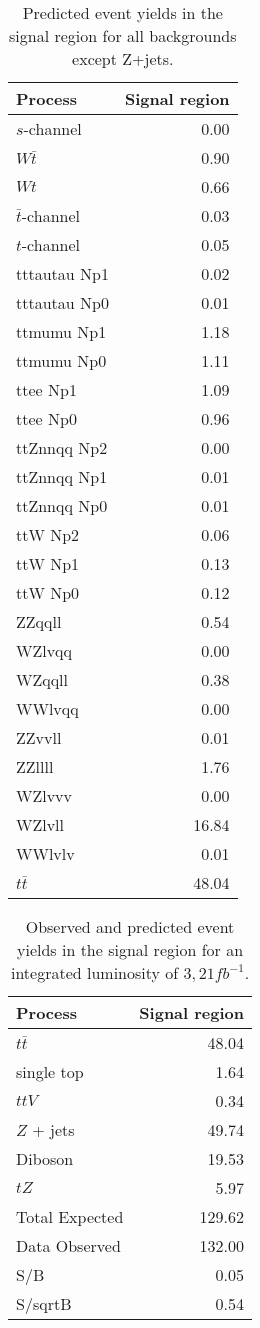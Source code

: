 \documentclass[10pt,twoside,a4paper]{article}
\begin{document}
 
\begin{table} [ht!]
\setlength{\tabcolsep}{2pt}
\footnotesize
\centering
\begin{tabular}{l | r}
\hline
\hline
Process & Signal region \\ 
\hline
$s$-channel & 0.00 \\ 
$W\bar{t}$ & 0.90 \\ 
$Wt$ & 0.66 \\ 
$\bar{t}$-channel & 0.03 \\ 
$t$-channel & 0.05 \\ 
tttautau Np1 & 0.02 \\ 
tttautau Np0 & 0.01 \\ 
ttmumu Np1 & 1.18 \\ 
ttmumu Np0 & 1.11 \\ 
ttee Np1 & 1.09 \\ 
ttee Np0 & 0.96 \\ 
ttZnnqq Np2 & 0.00 \\ 
ttZnnqq Np1 & 0.01 \\ 
ttZnnqq Np0 & 0.01 \\ 
ttW Np2 & 0.06 \\ 
ttW Np1 & 0.13 \\ 
ttW Np0 & 0.12 \\ 
ZZqqll & 0.54 \\ 
WZlvqq & 0.00 \\ 
WZqqll & 0.38 \\ 
WWlvqq & 0.00 \\ 
ZZvvll & 0.01 \\ 
ZZllll & 1.76 \\ 
WZlvvv & 0.00 \\ 
WZlvll & 16.84 \\ 
WWlvlv & 0.01 \\ 
$t\bar{t}$ & 48.04 \\ 
\hline
\hline
\end{tabular}
\caption{Predicted event yields in the signal region for all backgrounds except Z+jets.}
\label{tab:eventyield_BG}
\end{table}

 
\begin{table} [ht!]
\setlength{\tabcolsep}{2pt}
\footnotesize
\centering
\begin{tabular}{l | r}
\hline
\hline
Process & Signal region \\ 
\hline
$t\bar{t}$ & 48.04 \\ 
single top & 1.64 \\ 
$ttV$ & 0.34 \\ 
$Z$ + jets & 49.74 \\ 
Diboson & 19.53 \\ 
\hline
$tZ$ & 5.97 \\ 
\hline
Total Expected & 129.62 \\ 
Data Observed & 132.00 \\ 
\hline
 S/B & 0.05 \\ 
 S/sqrtB & 0.54 \\ 
\hline
\hline
\end{tabular}
\caption{Observed and predicted event yields in the signal region for an integrated luminosity of $3,21 fb^{-1}$.}
\label{tab:eventyield}
\end{table}
\end{document}
